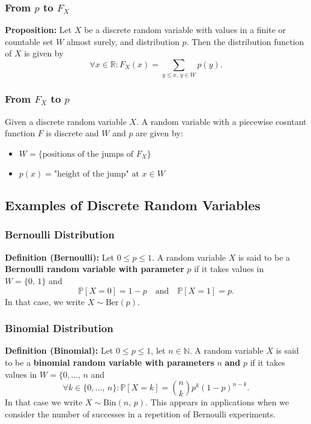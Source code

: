 \documentclass[a4paper]{extarticle}
\begin{document}
\subsubsection{From \(p\) to \(F_X\)}

\begin{cbox}
    \textbf{Proposition:} Let \(X\) be a discrete random variable with values in a finite or countable set \(W\) almost surely, and distribution \(p\). Then the distribution function of \(X\) is given by
    \[
        \forall x \in \mathbb{R} : F_X(x) = \sum_{y \leq x, \,y \in W} p(y).
    \]
\end{cbox}

\subsubsection{From \(F_X\) to \(p\)}

Given a discrete random variable \(X\). A random variable with a piecewise cosntant function \(F\) is discrete and \(W\) and \(p\) are given by:

\begin{itemize}
    \item \(W = \{\text{positions of the jumps of } F_X\}\)
    \item \(p(x) = \text{"height of the jump" at } x \in W\)
\end{itemize}

\subsection{Examples of Discrete Random Variables}

\subsubsection{Bernoulli Distribution}

\textbf{Definition (Bernoulli):} Let \(0 \leq p \leq 1\). A random variable \(X\) is said to be a \textbf{Bernoulli random variable with parameter} \(p\) if it takes values in \(W = \{0, \, 1\}\) and
\[
    \mathbb{P}[X = 0] = 1 - p \quad \text{and} \quad \mathbb{P}[X = 1] = p.
\]
In that case, we write \(X \sim \text{Ber}(p)\).

\subsubsection{Binomial Distribution}

\textbf{Definition (Binomial):} Let \(0 \leq p \leq 1\), let \(n \in \mathbb{N}\). A random variable \(X\) is said to be a \textbf{binomial random variable with parameters} \(n\) \textbf{and} \(p\) if it takes values in \(W = \{0,..., \, n\) and
\[
    \forall k \in \{0,..., \, n\} : \mathbb{P}[X = k] = \binom{n}{k} p^k (1 - p)^{n - k}.
\]
In that case we write \(X \sim \text{Bin}(n, \, p)\). This appears in applications when we consider the number of successes in a repetition of Bernoulli experiments.
\end{document}
